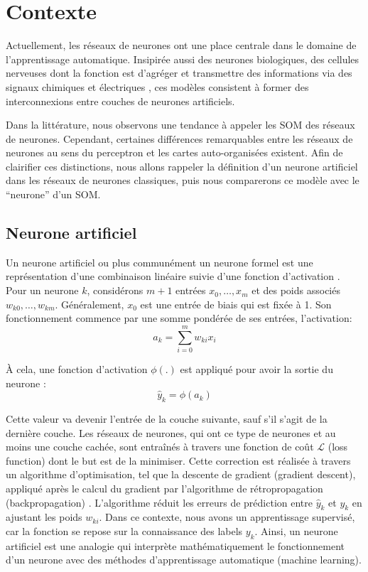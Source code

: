 \documentclass[12pt,a4paper]{report}
\begin{document}
\section{Contexte}
Actuellement, les réseaux de neurones ont une place centrale dans le domaine de l'apprentissage automatique. 
Insipirée aussi des neurones biologiques, des cellules nerveuses dont la fonction est d'agréger et transmettre 
des informations via des signaux chimiques et électriques \cite{Neurone_wikipedia}, ces modèles consistent à former des interconnexions entre 
couches de neurones artificiels. 

Dans la littérature, nous observons une tendance à appeler les SOM des réseaux 
de neurones. Cependant, certaines différences remarquables entre les réseaux de neurones au sens du perceptron et les cartes 
auto-organisées existent. Afin de clairifier ces distinctions, nous allons rappeler la définition d'un neurone artificiel dans les réseaux de neurones classiques, 
puis nous comparerons ce modèle avec le “neurone” d'un SOM.

\subsection{Neurone artificiel}
Un neurone artificiel ou plus communément un neurone formel est une représentation d'une combinaison linéaire suivie d'une fonction d'activation \cite{Cours_IA_UNIGE}. 
Pour un neurone $k$, considérons $m+1$ entrées  $x_0,\dots, x_m$ et des poids associés $w_{k0}, \dots, w_{km}$. Généralement, $x_0$ est une entrée de biais qui est fixée à 1.
Son fonctionnement commence par une somme pondérée de ses entrées, l'activation:   
$$
a_k = \sum_{i=0}^{m} w_{ki} x_i
$$

À cela, une fonction d'activation $\phi(.)$ \cite{Artificial_neuron_wikipedia} est appliqué pour avoir la sortie du neurone :
$$
\hat{y}_k = \phi(a_k)
$$

Cette valeur va devenir l'entrée de la couche suivante, sauf s'il s'agit de la dernière couche. 
Les réseaux de neurones, qui ont ce type de neurones et au moins une couche cachée, sont entraînés à travers une fonction de coût $\mathcal{L}$ (loss function) dont le but est de la minimiser. 
Cette correction est réalisée à travers un algorithme d'optimisation, tel que la descente de gradient (gradient descent), appliqué après le calcul du gradient par l'algorithme
de rétropropagation (backpropagation) \cite{Cours_IA_UNIGE}.
L'algorithme réduit les erreurs de prédiction entre $\hat{y}_k$ et $y_k$ en ajustant les poids $w_{ki}$. 
Dans ce contexte, nous avons un apprentissage supervisé, car la fonction se repose sur la connaissance des labels $y_k$.  
Ainsi, un neurone artificiel est une analogie qui interprète mathématiquement 
le fonctionnement d'un neurone avec des méthodes d'apprentissage automatique (machine learning).
\end{document}
